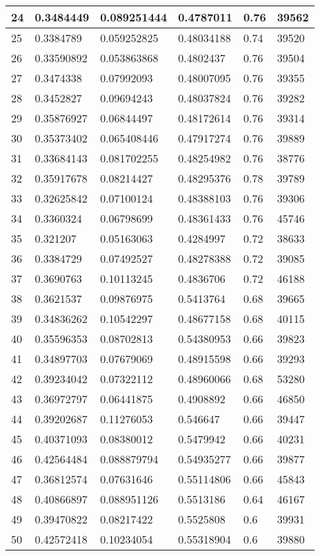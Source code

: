 \begin{longtable}{|l|l|l|l|l|l|}
24 & 0.3484449 & 0.089251444 & 0.4787011 & 0.76 & 39562 \\ \hline 
25 & 0.3384789 & 0.059252825 & 0.48034188 & 0.74 & 39520 \\ \hline 
26 & 0.33590892 & 0.053863868 & 0.4802437 & 0.76 & 39504 \\ \hline 
27 & 0.3474338 & 0.07992093 & 0.48007095 & 0.76 & 39355 \\ \hline 
28 & 0.3452827 & 0.09694243 & 0.48037824 & 0.76 & 39282 \\ \hline 
29 & 0.35876927 & 0.06844497 & 0.48172614 & 0.76 & 39314 \\ \hline 
30 & 0.35373402 & 0.065408446 & 0.47917274 & 0.76 & 39889 \\ \hline 
31 & 0.33684143 & 0.081702255 & 0.48254982 & 0.76 & 38776 \\ \hline 
32 & 0.35917678 & 0.08214427 & 0.48295376 & 0.78 & 39789 \\ \hline 
33 & 0.32625842 & 0.07100124 & 0.48388103 & 0.76 & 39306 \\ \hline 
34 & 0.3360324 & 0.06798699 & 0.48361433 & 0.76 & 45746 \\ \hline 
35 & 0.321207 & 0.05163063 & 0.4284997 & 0.72 & 38633 \\ \hline 
36 & 0.3384729 & 0.07492527 & 0.48278388 & 0.72 & 39085 \\ \hline 
37 & 0.3690763 & 0.10113245 & 0.4836706 & 0.72 & 46188 \\ \hline 
38 & 0.3621537 & 0.09876975 & 0.5413764 & 0.68 & 39665 \\ \hline 
39 & 0.34836262 & 0.10542297 & 0.48677158 & 0.68 & 40115 \\ \hline 
40 & 0.35596353 & 0.08702813 & 0.54380953 & 0.66 & 39823 \\ \hline 
41 & 0.34897703 & 0.07679069 & 0.48915598 & 0.66 & 39293 \\ \hline 
42 & 0.39234042 & 0.07322112 & 0.48960066 & 0.68 & 53280 \\ \hline 
43 & 0.36972797 & 0.06441875 & 0.4908892 & 0.66 & 46850 \\ \hline 
44 & 0.39202687 & 0.11276053 & 0.546647 & 0.66 & 39447 \\ \hline 
45 & 0.40371093 & 0.08380012 & 0.5479942 & 0.66 & 40231 \\ \hline 
46 & 0.42564484 & 0.088879794 & 0.54935277 & 0.66 & 39877 \\ \hline 
47 & 0.36812574 & 0.07631646 & 0.55114806 & 0.66 & 45843 \\ \hline 
48 & 0.40866897 & 0.088951126 & 0.5513186 & 0.64 & 46167 \\ \hline 
49 & 0.39470822 & 0.08217422 & 0.5525808 & 0.6 & 39931 \\ \hline 
50 & 0.42572418 & 0.10234054 & 0.55318904 & 0.6 & 39880 \\ \hline 
\end{longtable}